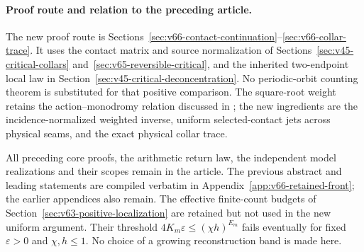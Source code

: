 \paragraph{Proof route and relation to the preceding article.}
The new proof route is
Sections~\ref{sec:v66-contact-continuation}--\ref{sec:v66-collar-trace}.
It uses the contact matrix and source normalization of
Sections~\ref{sec:v45-critical-collars} and~\ref{sec:v65-reversible-critical},
and the inherited two-endpoint local law in
Section~\ref{sec:v45-critical-deconcentration}. No periodic-orbit
counting theorem is substituted for that positive comparison. The
square-root weight retains the action--monodromy relation discussed
in \cite{BT65}; the new ingredients are the incidence-normalized
weighted inverse, uniform selected-contact jets across physical seams,
and the exact physical collar trace.

All preceding core proofs, the arithmetic return law, the independent
model realizations and their scopes remain in the article. The previous
abstract and leading statements are compiled verbatim in
Appendix~\ref{app:v66-retained-front}; the earlier appendices also remain.
The effective finite-count budgets of
Section~\ref{sec:v63-positive-localization} are retained but not used in
the new uniform argument. Their threshold
$4K_m\varepsilon\le(\chi h)^{E_m}$ fails eventually for fixed
$\varepsilon>0$ and $\chi,h\le1$. No choice of a growing reconstruction
band is made here.

